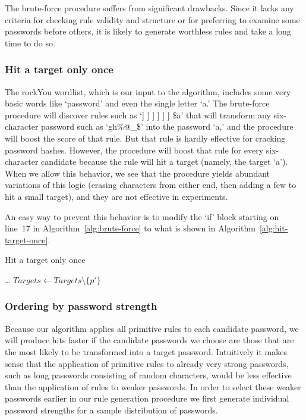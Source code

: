 \documentclass[letterpaper,twocolumn,10pt]{article}
\begin{document}
The brute-force procedure suffers from significant drawbacks. Since it lacks
any criteria for checking rule validity and structure or for preferring to
examine some passwords before others, it is likely to generate worthless rules
and take a long time to do so.

\subsubsection{Hit a target only once}

The rockYou wordlist, which is our input to the algorithm, includes some very
basic words like `password' and even the single letter `a.' The brute-force
procedure will discover rules such as `] ] ] ] ] ] \$a' that will transform any
six-character password such as `gh\%@\_\$' into the password `a,' and the
procedure will boost the score of that rule. But that rule is hardly effective
for cracking password hashes. However, the procedure will boost that rule for
every six-character candidate because the rule will hit a target (namely, the
target `a'). When we allow this behavior, we see that the procedure yields
abundant variations of this logic (erasing characters from either end, then
adding a few to hit a small target), and they are not effective in experiments.

An easy way to prevent this behavior is to modify the `if' block starting on
line~17 in Algorithm~\ref{alg:brute-force} to what is shown in
Algorithm~\ref{alg:hit-target-once}.

\begin{algorithm}\caption{Hit a target only once}
\begin{algorithmic}
        \State \dots
      \EndFor
      \State $Targets \gets Targets \setminus \{p'\}$
    \EndIf
\end{algorithmic}
\label{alg:hit-target-once}
\end{algorithm}

\subsubsection{Ordering by password strength}

Because our algorithm applies all primitive rules to each candidate password,
we will produce hits faster if the candidate passwords we choose are those that
are the most likely to be transformed into a target password. Intuitively it
makes sense that the application of primitive rules to already very strong
passwords, such as long passwords consisting of random characters, would be less
effective than the application of rules to weaker passwords. In order to select
these weaker passwords earlier in our rule generation procedure we first
generate individual password strengths for a sample distribution of passwords.
\end{document}
